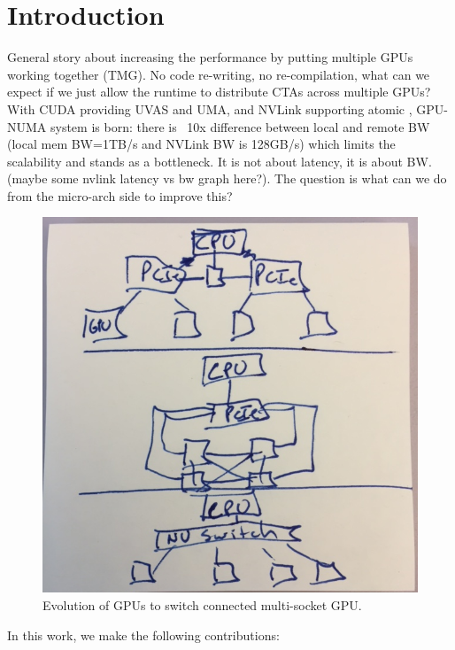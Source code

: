 \section{Introduction}
\label{introduction}


General story about increasing the performance by putting multiple GPUs working 
together (TMG). No code re-writing, no re-compilation, what can we expect if we 
just allow the runtime to distribute CTAs across multiple GPUs?
With CUDA providing UVAS and UMA, and NVLink supporting atomic , GPU-NUMA system 
is born: there is ~10x difference between local and remote BW (local mem 
BW=1TB/s and NVLink BW is 128GB/s) which limits the scalability and stands as a 
bottleneck. It is not about latency, it is about BW. (maybe some nvlink latency 
vs bw graph here?). The question is what can we do from the micro-arch side to 
improve this?

\begin{figure}[t]
\centering
\includegraphics[width=0.9\columnwidth]{figures/fig1.jpg}
\caption{Evolution of GPUs to switch connected multi-socket GPU.}

\label{fig:motivation}
\end{figure}

In this work, we make the following contributions:

